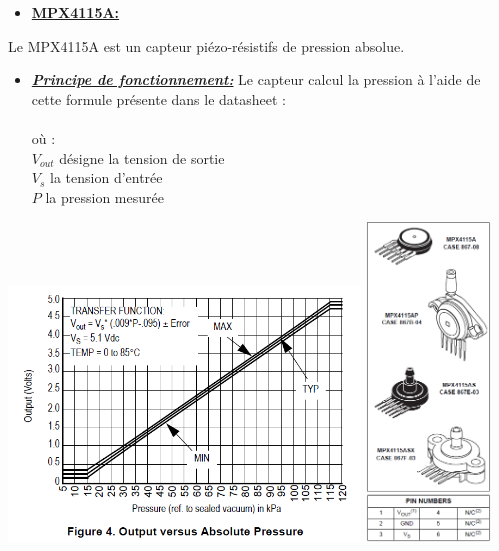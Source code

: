 \documentclass[a4paper,12pt]{report}
\begin{document}
\vspace{1cm}

\begin{itemize} 
\setlength{\itemindent}{1cm}
 \item \underline{\textbf{MPX4115A:}}
\end{itemize}

\setlength{\itemindent}{3cm}

Le MPX4115A est un capteur piézo-résistifs de pression absolue.\\

\begin{itemize}

\setlength{\itemindent}{2cm}
\item \underline{\textit{\textbf{Principe de fonctionnement:}}} 
Le capteur calcul la pression à l'aide de cette formule présente dans le datasheet :\\     \\
 où : \\ $V_{out}$ désigne la tension de sortie \\ $V_s$ la tension d'entrée \\ $P$ la pression mesurée 


\end{itemize} 

\includegraphics[width=0.70\textwidth]{3.png}
\includegraphics[width=0.25\textwidth]{4.png}
\end{document}
